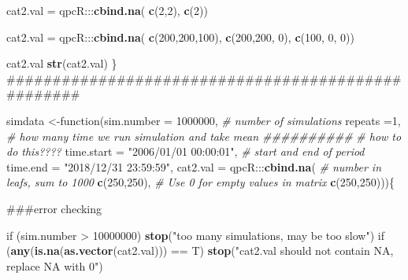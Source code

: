 \documentclass[]{article}
\newenvironment{Shaded}{\begin{snugshade}}{\end{snugshade}}
\newcommand{\KeywordTok}[1]{\textcolor[rgb]{0.13,0.29,0.53}{\textbf{{#1}}}}
\newcommand{\DataTypeTok}[1]{\textcolor[rgb]{0.13,0.29,0.53}{{#1}}}
\newcommand{\DecValTok}[1]{\textcolor[rgb]{0.00,0.00,0.81}{{#1}}}
\newcommand{\StringTok}[1]{\textcolor[rgb]{0.31,0.60,0.02}{{#1}}}
\newcommand{\CommentTok}[1]{\textcolor[rgb]{0.56,0.35,0.01}{\textit{{#1}}}}
\newcommand{\NormalTok}[1]{{#1}}
\begin{document}
\begin{Shaded}
\begin{Highlighting}[]
{{\NormalTok{cat2.val =}\StringTok{ }\NormalTok{qpcR:::}\KeywordTok{cbind.na}\NormalTok{(             }
  \KeywordTok{c}\NormalTok{(}\DecValTok{2}\NormalTok{,}\DecValTok{2}\NormalTok{),                       }
  \KeywordTok{c}\NormalTok{(}\DecValTok{2}\NormalTok{))}

\NormalTok{cat2.val =}\StringTok{ }\NormalTok{qpcR:::}\KeywordTok{cbind.na}\NormalTok{(             }
  \KeywordTok{c}\NormalTok{(}\DecValTok{200}\NormalTok{,}\DecValTok{200}\NormalTok{,}\DecValTok{100}\NormalTok{),                       }
  \KeywordTok{c}\NormalTok{(}\DecValTok{200}\NormalTok{,}\DecValTok{200}\NormalTok{,  }\DecValTok{0}\NormalTok{),}
  \KeywordTok{c}\NormalTok{(}\DecValTok{100}\NormalTok{,  }\DecValTok{0}\NormalTok{,  }\DecValTok{0}\NormalTok{))}

\NormalTok{cat2.val}
\KeywordTok{str}\NormalTok{(cat2.val)}
\NormalTok{\}}
\NormalTok{###################################################}

\NormalTok{simdata <-function(}\DataTypeTok{sim.number =} \DecValTok{1000000}\NormalTok{,                   }\CommentTok{# number of simulations}
                   \DataTypeTok{repeats =}\DecValTok{1}\NormalTok{,                             }\CommentTok{# how many time we run simulation and take mean  ##########}
                                                           \CommentTok{# how to do this????}
                   \DataTypeTok{time.start =} \StringTok{"2006/01/01 00:00:01"}\NormalTok{,     }\CommentTok{# start and end of period }
                   \DataTypeTok{time.end =} \StringTok{"2018/12/31 23:59:59"}\NormalTok{,}
                   \DataTypeTok{cat2.val =} \NormalTok{qpcR:::}\KeywordTok{cbind.na}\NormalTok{(             }\CommentTok{# number in leafs, sum to 1000}
                     \KeywordTok{c}\NormalTok{(}\DecValTok{250}\NormalTok{,}\DecValTok{250}\NormalTok{),                           }\CommentTok{# Use 0 for empty values in matrix }
                     \KeywordTok{c}\NormalTok{(}\DecValTok{250}\NormalTok{,}\DecValTok{250}\NormalTok{)))\{                         }
  
\NormalTok{###error checking}
  
  \NormalTok{if (sim.number >}\StringTok{ }\DecValTok{10000000}\NormalTok{)}
    \KeywordTok{stop}\NormalTok{(}\StringTok{"too many simulations, may be too slow"}\NormalTok{)}
  \NormalTok{if (}\KeywordTok{any}\NormalTok{(}\KeywordTok{is.na}\NormalTok{(}\KeywordTok{as.vector}\NormalTok{(cat2.val))) ==}\StringTok{ }\NormalTok{T)}
    \KeywordTok{stop}\NormalTok{(}\StringTok{"cat2.val should not contain NA, replace NA with 0"}\NormalTok{)}

}}
\end{Highlighting}
\end{Shaded}
\end{document}
